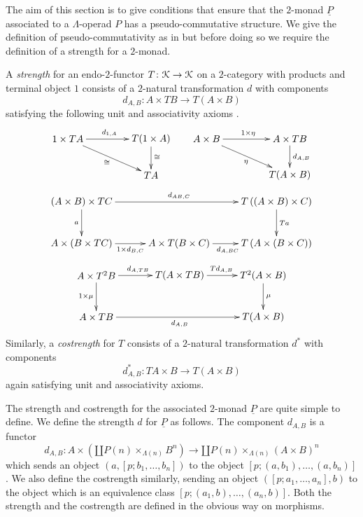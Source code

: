 The aim of this section is to give conditions that ensure that the $2$-monad $\underline{P}$ associated to a $\Lambda$-operad $P$ has a pseudo-commutative structure. We give the definition of pseudo-commutativity as in \cite{HP} but before doing so we require the definition of a strength for a $2$-monad.
\begin{Defi}\label{Defi:strengths}
A \textit{strength} for an endo-$2$-functor $T \colon \mathcal{K} \rightarrow \mathcal{K}$ on a $2$-category with products and terminal object $1$ consists of a $2$-natural transformation $d$ with components
    \[
        d_{A,B} \colon A \times TB \rightarrow T(A \times B)
    \]
satisfying the following unit and associativity axioms \cite{kock-monads}.
  \[
    \xy
    (0,0)*+{1 \times TA}="ul1";
    (30,0)*+{T(1 \times A)}="ur1";
    (30,-13)*+{TA}="br1";
    (50,0)*+{A \times B}="ul2";
    (80,0)*+{A \times TB}="ur2";
    (80,-13)*+{T(A \times B)}="br2";
    {\ar^{d_{1,A}} "ul1"; "ur1"};
    {\ar^{\cong} "ur1"; "br1"};
    {\ar_{\cong} "ul1"; "br1"};
    {\ar^{1 \times \eta} "ul2"; "ur2"};
    {\ar^{d_{A,B}} "ur2"; "br2"};
    {\ar_{\eta} "ul2"; "br2"};
    \endxy
  \]
  \[
    \xy
    (0,0)*+{(A \times B) \times TC}="ul";
    (70,0)*+{T \left((A \times B) \times C \right)}="ur";
    (0,-15)*+{A \times (B \times TC)}="ll";
    (35,-15)*+{A \times T(B \times C)}="m";
    (70,-15)*+{ T \left(A \times (B \times C) \right)}="lr";
    {\ar^{d_{AB,C}} "ul"; "ur"};
    {\ar^{Ta} "ur"; "lr"};
    {\ar_{a} "ul"; "ll"};
    {\ar_{1 \times d_{B,C}} "ll"; "m"};
    {\ar_{d_{A,BC}} "m"; "lr"};
    \endxy
  \]
  \[
    \xy
    (0,0)*+{A \times T^{2}B}="ul";
    (60,0)*+{T^{2}(A \times B)}="ur";
    (0,-15)*+{A \times TB}="ll";
    (30,0)*+{T(A \times TB)}="m";
    (60,-15)*+{ T(A \times B)}="lr";
    {\ar^{d_{A,TB}} "ul"; "m"};
    {\ar^{Td_{A,B}} "m"; "ur"};
    {\ar^{\mu} "ur"; "lr"};
    {\ar_{1 \times \mu} "ul"; "ll"};
    {\ar_{d_{A,B}} "ll"; "lr"};
    \endxy
  \]
Similarly, a \emph{costrength} for $T$ consists of a $2$-natural transformation $d^{\ast}$ with components
  \[
      d^{\ast}_{A,B} \colon TA \times B \rightarrow T(A \times B)
  \]
again satisfying unit and associativity axioms.
\end{Defi}
The strength and costrength for the associated $2$-monad $\underline{P}$ are quite simple to define. We define the strength $d$ for $\underline{P}$ as follows. The component $d_{A,B}$ is a functor
    \[
        d_{A,B} \colon A \times \left(\amalg P(n) \times_{\Lambda(n)} B^n\right) \rightarrow \amalg P(n) \times_{\Lambda(n)} \left(A \times B \right)^n
    \]
which sends an object $(a, [p;b_1,\ldots,b_n])$ to the object $[p;(a,b_1),\ldots,(a,b_n)]$. We also define the costrength similarly, sending an object $([p;a_1,\ldots,a_n],b)$ to the object which is an equivalence class $[p;(a_1,b), \ldots, (a_n, b)]$. Both the strength and the costrength are defined in the obvious way on morphisms.

